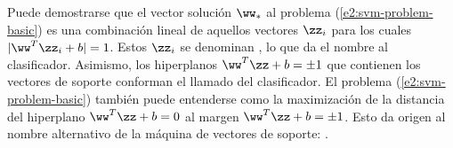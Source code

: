 Puede demostrarse que el vector solución $\ww_*$ al problema
(\ref{e2:svm-problem-basic}) es una combinación lineal de aquellos
vectores $\zz_i$ para los cuales $|\ww^T\zz_i+b|=1$. Estos $\zz_i$ se
denominan , lo que da el nombre al
clasificador.  Asimismo, los hiperplanos $\ww^T\zz+b=\pm1$ que
contienen los vectores de soporte conforman el llamado  del
clasificador. El problema (\ref{e2:svm-problem-basic}) también puede
entenderse como la maximización de la distancia del hiperplano
$\ww^T\zz+b=0$ al margen $\ww^T\zz+b=\pm1$. Esto da origen al nombre
alternativo de la máquina de vectores de soporte: .

